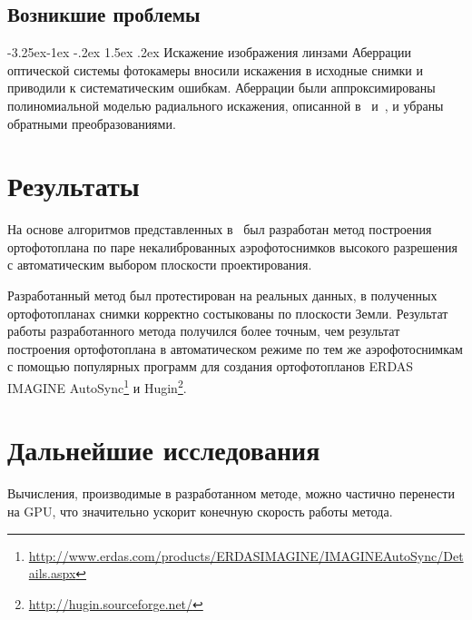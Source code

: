 \documentclass[a4paper,12pt]{article}
\makeatletter
\renewcommand\paragraph{\@startsection{paragraph}{4}{\z@}%
  {-3.25ex\@plus -1ex \@minus -.2ex}%
  {1.5ex \@plus .2ex}%
  {\normalfont\normalsize\bfseries}}
\makeatother
\begin{document}

\subsection{Возникшие проблемы}
\paragraph{Искажение изображения линзами}%
Аберрации оптической системы фотокамеры вносили искажения в исходные снимки 
и приводили к систематическим ошибкам.
Аберрации были аппроксимированы полиномиальной моделью радиального искажения, 
описанной в~\cite{forsythponce04compvis} и~\cite{szelisky10compvis}, 
и убраны обратными преобразованиями.


\section{Результаты}
На основе алгоритмов представленных в~\cite{cham98matchframework, brown03recognising, mclauchlan02mosaic}
был разработан метод построения ортофотоплана по паре некалиброванных 
аэрофотоснимков высокого разрешения с автоматическим выбором плоскости проектирования. 

Разработанный метод был протестирован на реальных данных, в полученных 
ортофотопланах снимки корректно состыкованы по плоскости Земли.
Результат работы разработанного метода получился более точным, 
чем результат построения ортофотоплана в автоматическом режиме 
по тем же аэрофотоснимкам с помощью популярных программ для создания ортофотопланов 
ERDAS IMAGINE AutoSync\footnote{\url{http://www.erdas.com/products/ERDASIMAGINE/IMAGINEAutoSync/Details.aspx}}
и Hugin\footnote{\url{http://hugin.sourceforge.net/}}.

\section{Дальнейшие исследования}

Вычисления, производимые в разработанном методе, можно частично перенести на GPU, что 
значительно ускорит конечную скорость работы метода.
\end{document}
